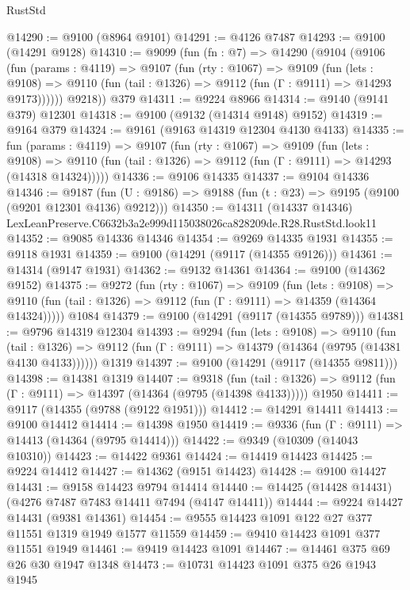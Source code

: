 \begin{lexlean}{RustStd}
\begin{coremodule}
@14290 := @9100 (@8964 @9101)
@14291 := @4126 @7487
@14293 := @9100 (@14291 @9128)
@14310 := @9099
    (fun (fn : @7) =>
    @14290
      (@9104
        (@9106
          (fun (params : @4119) =>
          @9107
            (fun (rty : @1067) =>
            @9109
              (fun (lets : @9108) =>
              @9110 (fun (tail : @1326) => @9112 (fun (Γ : @9111) => @14293 @9173))))))
        @9218))
    @379
@14311 := @9224 @8966
@14314 := @9140 (@9141 @379) @12301
@14318 := @9100 (@9132 (@14314 @9148) @9152)
@14319 := @9164 @379
@14324 := @9161 (@9163 @14319 @12304 @4130 @4133)
@14335 := fun (params : @4119) =>
  @9107
    (fun (rty : @1067) =>
    @9109
      (fun (lets : @9108) =>
      @9110 (fun (tail : @1326) => @9112 (fun (Γ : @9111) => @14293 (@14318 @14324)))))
@14336 := @9106 @14335
@14337 := @9104 @14336
@14346 := @9187
    (fun (U : @9186) => @9188 (fun (t : @23) => @9195 (@9100 (@9201 @12301 @4136) @9212)))
@14350 := @14311
    (@14337 @14346)
    LexLeanPreserve.C6632b3a2e999d115038026ca828209de.R28.RustStd.look11
@14352 := @9085 @14336 @14346
@14354 := @9269 @14335 @1931
@14355 := @9118 @1931
@14359 := @9100 (@14291 (@9117 (@14355 @9126)))
@14361 := @14314 (@9147 @1931)
@14362 := @9132 @14361
@14364 := @9100 (@14362 @9152)
@14375 := @9272
    (fun (rty : @1067) =>
    @9109
      (fun (lets : @9108) =>
      @9110 (fun (tail : @1326) => @9112 (fun (Γ : @9111) => @14359 (@14364 @14324)))))
    @1084
@14379 := @9100 (@14291 (@9117 (@14355 @9789)))
@14381 := @9796 @14319 @12304
@14393 := @9294
    (fun (lets : @9108) =>
    @9110
      (fun (tail : @1326) =>
      @9112 (fun (Γ : @9111) => @14379 (@14364 (@9795 (@14381 @4130 @4133))))))
    @1319
@14397 := @9100 (@14291 (@9117 (@14355 @9811)))
@14398 := @14381 @1319
@14407 := @9318
    (fun (tail : @1326) => @9112 (fun (Γ : @9111) => @14397 (@14364 (@9795 (@14398 @4133)))))
    @1950
@14411 := @9117 (@14355 (@9788 (@9122 @1951)))
@14412 := @14291 @14411
@14413 := @9100 @14412
@14414 := @14398 @1950
@14419 := @9336 (fun (Γ : @9111) => @14413 (@14364 (@9795 @14414)))
@14422 := @9349 (@10309 (@14043 @10310))
@14423 := @14422 @9361
@14424 := @14419 @14423
@14425 := @9224 @14412
@14427 := @14362 (@9151 @14423)
@14428 := @9100 @14427
@14431 := @9158 @14423 @9794 @14414
@14440 := @14425 (@14428 @14431) (@4276 @7487 @7483 @14411 @7494 (@4147 @14411))
@14444 := @9224 @14427 @14431 (@9381 @14361)
@14454 := @9555 @14423 @1091 @122 @27 @377 @11551 @1319 @1949 @1577 @11559
@14459 := @9410 @14423 @1091 @377 @11551 @1949
@14461 := @9419 @14423 @1091
@14467 := @14461 @375 @69 @26 @30 @1947 @1348
@14473 := @10731 @14423 @1091 @375 @26 @1943 @1945

\end{coremodule}
\end{lexlean}
